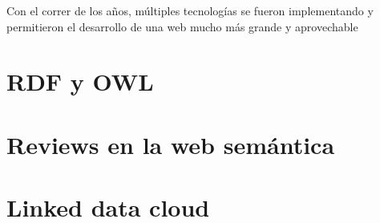 Con el correr de los años, múltiples tecnologías se fueron implementando y permitieron el desarrollo de una web mucho más grande y aprovechable

\section{RDF y OWL} 
\label{section:rdf-owl}

\section{Reviews en la web semántica}
\label{section:reviews-en-la-web}

\section{Linked data cloud}
\label{section:linked-data-cloud}
